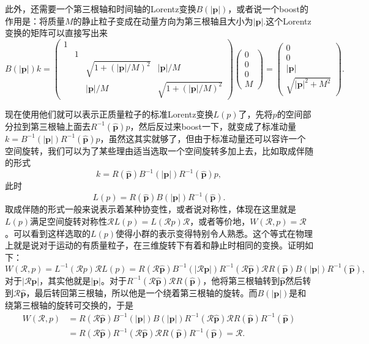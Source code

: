 此外，还需要一个第三根轴和时间轴的Lorentz变换$B(|\bm{p}|)$，或者说一个boost的作用是：将质量$M$的静止粒子变成在动量方向为第三根轴且大小为$|\bm{p}|$.这个Lorentz变换的矩阵可以直接写出来
\[
	B(|\bm{p}|)k=
	\begin{pmatrix}
		1&&&\\
		&1&&\\
		&&\sqrt{1+(|\bm{p}|/M)^2}&|\bm{p}|/M\\
		&&|\bm{p}|/M&\sqrt{1+(|\bm{p}|/M)^2}
	 \end{pmatrix}
	 \begin{pmatrix}
		0\\
		0\\
		0\\
		M
	 \end{pmatrix}
	 =
	  \begin{pmatrix}
		0\\
		0\\
		|\bm{p}|\\
		\sqrt{|\bm{p}|^2+M^2}
	 \end{pmatrix}.
\]

现在使用他们就可以表示正质量粒子的标准Lorentz变换$L(p)$了，先将$p$的空间部分拉到第三根轴上面去$R^{-1}(\hat{\bm{p}})p$，然后反过来boost一下，就变成了标准动量$k=B^{-1}(|\bm{p}|)R^{-1}(\hat{\bm{p}})p$，虽然这其实就够了，但由于标准动量还可以容许一个空间旋转，我们可以为了某些理由适当选取一个空间旋转多加上去，比如取成伴随的形式
\[k=R(\hat{\bm{p}})B^{-1}(|\bm{p}|)R^{-1}(\hat{\bm{p}})p,\]此时
\[
L(p)=R(\hat{\bm{p}})B(|\bm{p}|)R^{-1}(\hat{\bm{p}}).
\]
取成伴随的形式一般来说表示着某种协变性，或者说对称性，体现在这里就是$L(p)$满足空间旋转对称性$\mathscr{R}L(p)=L(\mathscr{R}p)\mathscr{R}$，或者等价地，$W(\mathscr{R},p)=\mathscr{R}$。可以看到这样选取的$L(p)$使得小群的表示变得特别令人熟悉。这个等式在物理上就是说对于运动的有质量粒子，在三维旋转下有着和静止时相同的变换。证明如下：
\[
W(\mathscr{R},p)=L^{-1}(\mathscr{R}p)\mathscr{R}L(p)=R(\mathscr{R}\hat{\bm{p}})B^{-1}(|\mathscr{R}\bm{p}|)R^{-1}(\mathscr{R}\hat{\bm{p}})\mathscr{R}R(\hat{\bm{p}})B(|\bm{p}|)R^{-1}(\hat{\bm{p}}),
\]
对于$|\mathscr{R}\bm{p}|$，其实他就是$|\bm{p}|$。对于$R^{-1}(\mathscr{R}\hat{\bm{p}})\mathscr{R}R(\hat{\bm{p}})$，他将第三根轴转到$\hat{\bm{p}}$然后转到$\mathscr{R}\hat{\bm{p}}$，最后转回第三根轴，所以他是一个绕着第三根轴的旋转。而$B(|\bm{p}|)$是和绕第三根轴的旋转可交换的，于是
\[
\begin{split}
W(\mathscr{R},p)&=R(\mathscr{R}\hat{\bm{p}})B^{-1}(|\bm{p}|)B(|\bm{p}|)R^{-1}(\mathscr{R}\hat{\bm{p}})\mathscr{R}R(\hat{\bm{p}})R^{-1}(\hat{\bm{p}})\\
&=R(\mathscr{R}\hat{\bm{p}})R^{-1}(\mathscr{R}\hat{\bm{p}})\mathscr{R}R(\hat{\bm{p}})R^{-1}(\hat{\bm{p}})=\mathscr{R}.
\end{split}
\]

